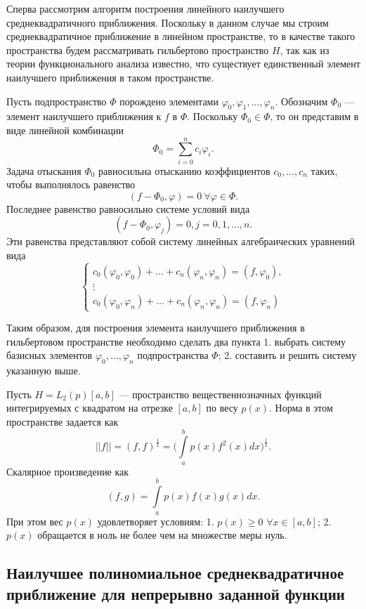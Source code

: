 \documentclass[11pt]{article}
\begin{document}
Сперва рассмотрим алгоритм построения линейного наилучшего
среднеквадратичного приближения. Поскольку в данном случае мы строим
среднеквадратичное приближение в линейном пространстве, то в качестве
такого пространства будем рассматривать гильбертово пространство \(H\),
так как из теории функционального анализа известно, что существует
единственный элемент наилучшего приближения в таком пространстве.

Пусть подпространство \(\Phi\) порождено элементами
\(\varphi_0,\varphi_1,\ldots, \varphi_n\). Обозначим \(\Phi_0\) ---
элемент наилучшего приближения к \(f\) в \(\Phi\). Поскольку
\(\Phi_0 \in \Phi\), то он представим в виде линейной комбинации
\[\Phi_0 = \sum_{i=0}^{n}c_i\varphi_i.\] Задача отыскания \(\Phi_0\)
равносильна отысканию коэффициентов \(c_0,\ldots, c_n\) таких, чтобы
выполнялось равенство
\[(f-\Phi_0, \varphi) = 0\ \forall \varphi \in \Phi.\] Последнее
равенство равносильно системе условий вида
\[(f-\Phi_0, \varphi_j) = 0, j = 0,1,\ldots, n.\] Эти равенства
представляют собой систему линейных алгебраических уравнений вида
\[\begin{cases}
    c_0(\varphi_0,\varphi_0) + \ldots + c_n(\varphi_n, \varphi_n) = (f,\varphi_0),\\
    \vdots\\
    c_0(\varphi_0,\varphi_n) + \ldots + c_n(\varphi_n, \varphi_n) = (f,\varphi_n)
 \end{cases}\]

Таким образом, для построения элемента наилучшего приближения в
гильбертовом пространстве необходимо сделать два пункта 1. выбрать
систему базисных элементов \(\varphi_0,\ldots, \varphi_n\)
подпространства \(\Phi\); 2. составить и решить систему указанную выше.

Пусть \(H = L_2(p)[a,b]\) --- пространство вещественнозначных функций
интегрируемых с квадратом на отрезке \([a,b]\) по весу \(p(x)\). Норма в
этом пространстве задается как
\[||f|| = (f,f)^{\frac12} = \Big(\int\limits_a^b p(x) f^2(x)dx\Big)^{\frac12}.\]
Скалярное произведение как \[(f,g) = \int\limits_a^b p(x) f(x) g(x)dx.\]
При этом вес \(p(x)\) удовлетворяет условиям: 1. \(p(x) \geq 0\)
\(\forall x \in [a,b]\); 2. \(p(x)\) обращается в ноль не более чем на
множестве меры нуль.

\subsection*{Наилучшее полиномиальное среднеквадратичное приближение
для непрерывно заданной
функции}\label{ux43dux430ux438ux43bux443ux447ux448ux435ux435-ux43fux43eux43bux438ux43dux43eux43cux438ux430ux43bux44cux43dux43eux435-ux441ux440ux435ux434ux43dux435ux43aux432ux430ux434ux440ux430ux442ux438ux447ux43dux43eux435-ux43fux440ux438ux431ux43bux438ux436ux435ux43dux438ux435-ux434ux43bux44f-ux43dux435ux43fux440ux435ux440ux44bux432ux43dux43e-ux437ux430ux434ux430ux43dux43dux43eux439-ux444ux443ux43dux43aux446ux438ux438}
\end{document}
